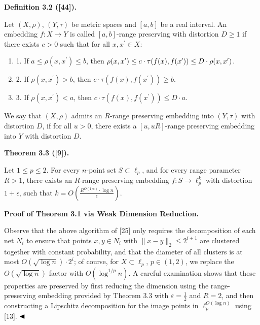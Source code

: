 \documentclass[10pt,a4paper]{amsart}
\begin{document}
\par\medskip\noindent\textbf{Definition 3.2 ([44]).}\par
Let $(X,\rho)$, $(Y,\tau)$ be metric spaces and $[a,b]$ be a real interval. An embedding $f:X\rightarrow Y$ is called $[a,b]$-range preserving with distortion $D\geq 1$  if there exists $c>0$ such that for all $x,x^{\prime}\in X$:
\par
\begin{enumerate}
\item  1. 
If $a\leq\rho(x,x^{\prime})\leq b$, then $\rho(x,x^{\prime})\leq c\cdot\tau(f(x),f(x^{\prime}))\leq D\cdot\rho(x,x^{%
\prime})$.
\par
\par
\item  2. 
If $\rho(x,x^{\prime})>b$, then $c\cdot\tau(f(x),f(x^{\prime}))\geq b$.
\par
\par
\item  3. 
If $\rho(x,x^{\prime})<a$, then $c\cdot\tau(f(x),f(x^{\prime}))\leq D\cdot a$.
\par
\par
\end{enumerate}
\par
\par
We say that $(X,\rho)$ admits an $R$-range preserving embedding into $(Y,\tau)$ with distortion $D$, if for all $u>0$, there exists a $[u,uR]$-range preserving embedding into $Y$ with distortion $D$.
\par
\par
\par\medskip\noindent\textbf{Theorem 3.3 ([9]).}\par
Let $1\leq p\leq 2$. For every $n$-point set $S\subset\ell_{p}$, and for every range parameter $R>1$, there exists an $R$-range preserving embedding $f:S\rightarrow\ell_{p}^{k}$ with distortion $1+\epsilon$, such that $k=O\left(\frac{R^{O(1/\epsilon)}\cdot\log n}{\epsilon}\right)$.
\par
\par
\par
\par
\par\medskip\noindent\textbf{Proof of Theorem 3.1 via Weak Dimension Reduction.}\par
Observe that the above algorithm of [25] only requires the decomposition of each net $N_{i}$ to ensure that points $x,y\in N_{i}$ with $\|x-y\|_{2}\leq 2^{i+1}$ are clustered together with constant probability, and that the diameter of all clusters is at most $O(\sqrt{\log{n}})\cdot 2^{i}$; of course, for $X\subset\ell_{p}$, $p\in(1,2)$, we replace the $O(\sqrt{\log{n}})$ factor with $O(\log^{1/p}{n})$. A careful examination shows that these properties are preserved by first reducing the dimension using the range-preserving embedding provided by Theorem 3.3 with $\varepsilon=\frac{1}{2}$ and $R=2$, and then constructing a Lipschitz decomposition for the image points in $\ell_{p}^{O(\log{n})}$ using [13]. $\hfill\blacktriangleleft$
\end{document}
